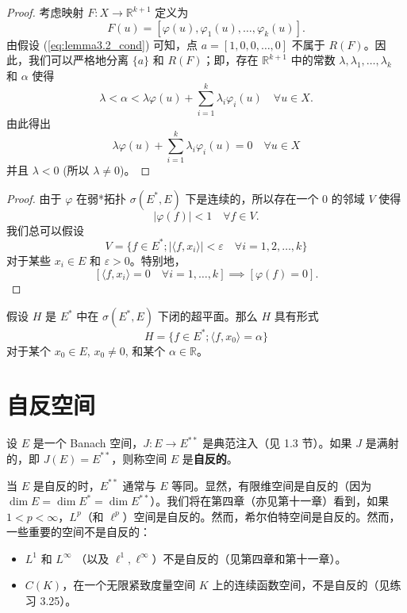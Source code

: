 \begin{proof}
考虑映射 $F: X \to \mathbb{R}^{k+1}$ 定义为
\[ F(u) = [\varphi(u), \varphi_1(u), \dots, \varphi_k(u)]. \]
由假设 (\ref{eq:lemma3.2_cond}) 可知，点 $a = [1, 0, 0, \dots, 0]$ 不属于 $R(F)$。因此，我们可以严格地分离 $\{a\}$ 和 $R(F)$；即，存在 $\mathbb{R}^{k+1}$ 中的常数 $\lambda, \lambda_1, \dots, \lambda_k$ 和 $\alpha$ 使得
\[ \lambda < \alpha < \lambda \varphi(u) + \sum_{i=1}^k \lambda_i \varphi_i(u) \quad \forall u \in X. \]
由此得出
\[ \lambda \varphi(u) + \sum_{i=1}^k \lambda_i \varphi_i(u) = 0 \quad \forall u \in X \]
并且 $\lambda < 0$ (所以 $\lambda \neq 0$)。
\end{proof}

\begin{proof}
由于 $\varphi$ 在弱*拓扑 $\sigma(E^*, E)$ 下是连续的，所以存在一个 $0$ 的邻域 $V$ 使得
\[ |\varphi(f)| < 1 \quad \forall f \in V. \]
我们总可以假设
\[ V = \{ f \in E^*; |\langle f, x_i \rangle| < \varepsilon \quad \forall i = 1, 2, \dots, k \} \]
对于某些 $x_i \in E$ 和 $\varepsilon > 0$。特别地，
\[ [\langle f, x_i \rangle = 0 \quad \forall i = 1, \dots, k] \implies [\varphi(f)=0]. \]
\end{proof}

\begin{corollary}\label{corollary3.15}
假设 $H$ 是 $E^*$ 中在 $\sigma(E^*, E)$ 下闭的超平面。那么 $H$ 具有形式
\[ H = \{f \in E^*; \langle f, x_0 \rangle = \alpha\} \]
对于某个 $x_0 \in E$, $x_0 \neq 0$, 和某个 $\alpha \in \mathbb{R}$。
\end{corollary}

\section{自反空间}

\begin{definition}\label{def_reflexive_space}
设 $E$ 是一个 Banach 空间，$J: E \to E^{**}$ 是典范注入（见 1.3 节）。如果 $J$ 是满射的，即 $J(E) = E^{**}$，则称空间 $E$ 是\textbf{自反的}。
\end{definition}

当 $E$ 是自反的时，$E^{**}$ 通常与 $E$ 等同。显然，有限维空间是自反的（因为 $\dim E = \dim E^* = \dim E^{**}$）。我们将在第四章（亦见第十一章）看到，如果 $1 < p < \infty$，$L^p$（和 $\ell^p$）空间是自反的。然而，希尔伯特空间是自反的。然而，一些重要的空间不是自反的：
\begin{itemize}
    \item $L^1$ 和 $L^\infty$ （以及 $\ell^1, \ell^\infty$）不是自反的（见第四章和第十一章）。
    \item $C(K)$，在一个无限紧致度量空间 $K$ 上的连续函数空间，不是自反的（见练习 3.25）。
\end{itemize}

